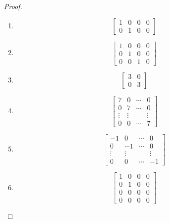 \begin{proof}
    \begin{enumerate}[label={(\alph*)}]
        \item \[
                  \begin{bmatrix}
                      1 & 0 & 0 & 0 \\
                      0 & 1 & 0 & 0
                  \end{bmatrix}
              \]
        \item \[
                  \begin{bmatrix}
                      1 & 0 & 0 & 0 \\
                      0 & 1 & 0 & 0 \\
                      0 & 0 & 1 & 0
                  \end{bmatrix}
              \]
        \item \[
                  \begin{bmatrix}
                      3 & 0 \\
                      0 & 3
                  \end{bmatrix}
              \]
        \item \[
                  \begin{bmatrix}
                      7      & 0      & \cdots & 0      \\
                      0      & 7      & \cdots & 0      \\
                      \vdots & \vdots &        & \vdots \\
                      0      & 0      & \cdots & 7
                  \end{bmatrix}
              \]
        \item \[
                  \begin{bmatrix}
                      -1     & 0      & \cdots & 0      \\
                      0      & -1     & \cdots & 0      \\
                      \vdots & \vdots &        & \vdots \\
                      0      & 0      & \cdots & -1
                  \end{bmatrix}
              \]
        \item \[
                  \begin{bmatrix}
                      1 & 0 & 0 & 0 \\
                      0 & 1 & 0 & 0 \\
                      0 & 0 & 0 & 0 \\
                      0 & 0 & 0 & 0
                  \end{bmatrix}
              \]
    \end{enumerate}
\end{proof}

